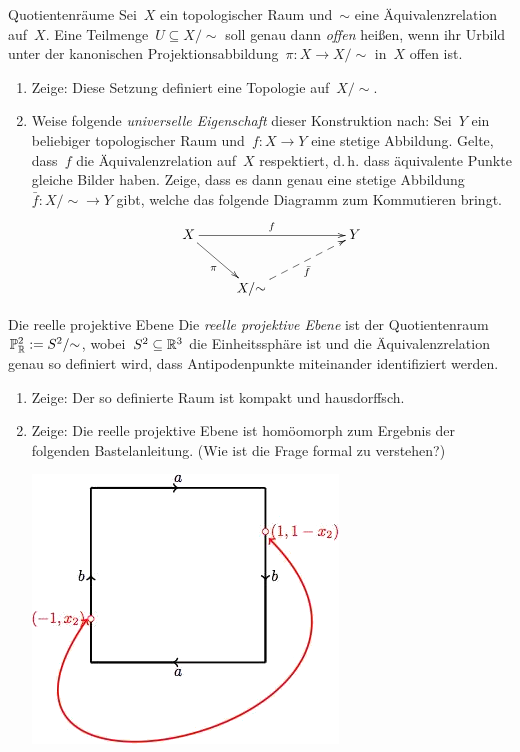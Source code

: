 \documentclass{uebblatt}
\begin{document}

\begin{aufgabe}{Quotientenräume}
Sei~$X$ ein topologischer Raum und~$\sim$ eine Äquivalenzrelation auf~$X$. Eine
Teilmenge~$U \subseteq X/{\sim}$ soll genau dann \emph{offen} heißen, wenn ihr Urbild
unter der kanonischen Projektionsabbildung~$\pi : X \to X/{\sim}$ in~$X$ offen ist.
\begin{enumerate}
\item Zeige: Diese Setzung definiert eine Topologie auf~$X/{\sim}$.
\item Weise folgende \emph{universelle Eigenschaft} dieser Konstruktion nach:
Sei~$Y$ ein beliebiger topologischer Raum und~$f : X \to Y$ eine stetige
Abbildung. Gelte, dass~$f$ die Äquivalenzrelation auf~$X$ respektiert, d.\,h.
dass äquivalente Punkte gleiche Bilder haben. Zeige, dass es dann genau eine
stetige Abbildung~$\bar f : X/{\sim} \to Y$ gibt, welche das folgende Diagramm
zum Kommutieren bringt.
\[ \xymatrix{
  X \ar[rd]_{\pi} \ar[rrr]^f &&& Y \\
  & X/{\sim} \ar@{-->}[rru]_{\bar f}
} \]
\end{enumerate}
\end{aufgabe}

\begin{aufgabe}{Die reelle projektive Ebene}
Die \emph{reelle projektive Ebene} ist der Quotientenraum~$\mathbb{P}^2_{\mathbb{R}} :=
S^2/{\sim}$, wobei~$S^2 \subseteq \mathbb{R}^3$ die Einheitssphäre ist und die
Äquivalenzrelation genau so definiert wird, dass Antipodenpunkte miteinander
identifiziert werden.
\begin{enumerate}
\item Zeige: Der so definierte Raum ist kompakt und hausdorffsch.
\item Zeige: Die reelle projektive Ebene ist homöomorph zum Ergebnis der
folgenden Bastelanleitung. (Wie ist die Frage formal zu verstehen?)
\begin{center}
  \vspace{0.5em}
  \includegraphics[scale=0.4]{reelle-projektive-ebene}
\end{center}
\end{enumerate}
\end{aufgabe}
\end{document}
